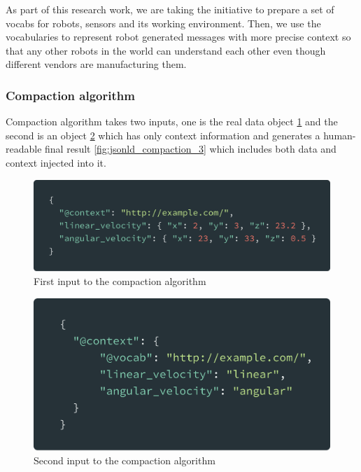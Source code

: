 	As part of this research work, we are taking the initiative to prepare a set of vocabs for robots, sensors and its working environment. Then, we use the vocabularies to represent robot generated messages with more precise context so that any other robots in the world can understand each other even though different vendors are manufacturing them.
	
	\subsubsection{Compaction algorithm}
	
	Compaction algorithm takes two inputs, one is the real data object \ref{fig:jsonld_compaction_1} and the second is an object \ref{fig:jsonld_compaction_2} which has only context information and generates a human-readable final result \ref{fig:jsonld_compaction_3} which includes both data and context injected into it.
	
			\begin{figure}[!htbp] 
		\begin{center}
			\includegraphics[scale=0.1]{./images/png/jsonld/compaction_1}	
			\caption{First input to the compaction algorithm}	
			\label{fig:jsonld_compaction_1}	
		\end{center}
	\end{figure}
	
	\begin{figure}[!htbp] 
		\begin{center}
			\includegraphics[scale=0.1]{./images/png/jsonld/compaction_2}	
			\caption{Second input to the compaction algorithm}	
			\label{fig:jsonld_compaction_2}	
		\end{center}
	\end{figure}
	

